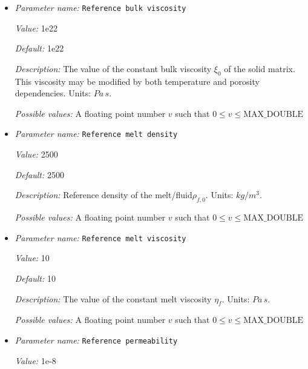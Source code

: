 \begin{itemize}
{\it Possible values:} A floating point number $v$ such that $-\text{MAX\_DOUBLE} \leq v \leq \text{MAX\_DOUBLE}$
\item {\it Parameter name:} {\tt Reference bulk viscosity}
\label{parameters:Material model/Melt simple/Reference bulk viscosity}


{\it Value:} 1e22


{\it Default:} 1e22


{\it Description:} The value of the constant bulk viscosity $\xi_0$ of the solid matrix. This viscosity may be modified by both temperature and porosity dependencies. Units: $Pa \, s$.


{\it Possible values:} A floating point number $v$ such that $0 \leq v \leq \text{MAX\_DOUBLE}$
\item {\it Parameter name:} {\tt Reference melt density}
\label{parameters:Material model/Melt simple/Reference melt density}


{\it Value:} 2500


{\it Default:} 2500


{\it Description:} Reference density of the melt/fluid$\rho_{f,0}$. Units: $kg/m^3$.


{\it Possible values:} A floating point number $v$ such that $0 \leq v \leq \text{MAX\_DOUBLE}$
\item {\it Parameter name:} {\tt Reference melt viscosity}
\label{parameters:Material model/Melt simple/Reference melt viscosity}


{\it Value:} 10


{\it Default:} 10


{\it Description:} The value of the constant melt viscosity $\eta_f$. Units: $Pa \, s$.


{\it Possible values:} A floating point number $v$ such that $0 \leq v \leq \text{MAX\_DOUBLE}$
\item {\it Parameter name:} {\tt Reference permeability}
\label{parameters:Material model/Melt simple/Reference permeability}


{\it Value:} 1e-8



\end{itemize}
